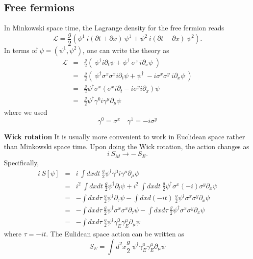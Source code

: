 \documentclass[submission, PhysLectNotes]{SciPost}
\begin{document}
\subsection{Free fermions}
In Minkowski space time, the Lagrange density for the free fermion reads
\begin{equation}
    \mathcal{L} = \frac{g}{2}\left(\psi^1\ i(\partial t + \partial x)\ \psi^1 + \psi^2\ i(\partial t - \partial x)\ \psi^2 \right).
\end{equation}
In terms of $\psi = (\psi^1,\psi^2)$, one can write the theory as
\begin{eqnarray}
    \mathcal{L} &=& \frac{g}{2} \left ( \ \psi^\dagger i\partial_t \psi + \psi^\dagger \ \sigma^z \ i\partial_x \psi \ \right) \nonumber \\
    &=& \frac{g}{2} \left ( \ \psi^\dagger \sigma^x\sigma^x i\partial_t \psi + \psi^\dagger \ -i\sigma^x\sigma^y \ i\partial_x \psi \ \right) \nonumber\\
    &=& \frac{g}{2} \psi^\dagger \sigma^x \left(\sigma^x i \partial_t - i\sigma^y i\partial_x \right) \psi \nonumber \\
    &=& \frac{g}{2} \psi^\dagger \gamma^0 i\gamma^\mu \partial_\mu \psi
\end{eqnarray}
where we used
\begin{equation}
    \gamma^0 = \sigma^x \quad \gamma^1 = -i\sigma^y
\end{equation}

{\bf Wick rotation}
It is usually more convenient to work in Euclidean space rather than Minkowski space time. Upon doing the Wick rotation, the action changes as
\begin{equation}
    i\ S_M \rightarrow -\ S_E.
\end{equation}
Specifically,
\begin{eqnarray}
    i\ S[\psi] &=& i\ \int dxdt \ \frac{g}{2} \psi^\dagger \gamma^0 i\gamma^\mu \partial_\mu \psi \nonumber \\
    &=& i^2 \ \int dxdt \ \frac{g}{2} \psi^\dagger \partial_t \psi + i^2 \ \int dxdt \ \frac{g}{2} \psi^\dagger \sigma^x (-i) \sigma^y \partial_x \psi \nonumber \\
    &=& -\int dxd\tau \ \frac{g}{2} \psi^\dagger \partial_\tau \psi - \int dxd(-i t) \ \frac{g}{2} \psi^\dagger \sigma^x \sigma^y \partial_x \psi \nonumber \\
    &=&  -\int dxd\tau \ \frac{g}{2} \psi^\dagger \sigma^x\sigma^x\partial_\tau \psi - \int dxd\tau \ \frac{g}{2} \psi^\dagger \sigma^x \sigma^y \partial_x \psi \nonumber \\
    &=&  -\int dxd\tau \ \frac{g}{2} \psi^\dagger \gamma^0_E\gamma^\mu_E\partial_\mu \psi
\end{eqnarray}
where $\tau = -it$. The Eulidean space action can be written as
\begin{equation}
    S_E = \int d^2x \frac{g}{2} \ \psi^\dagger \gamma^0_E\gamma^\mu_E\partial_\mu \psi
\end{equation}
\end{document}
